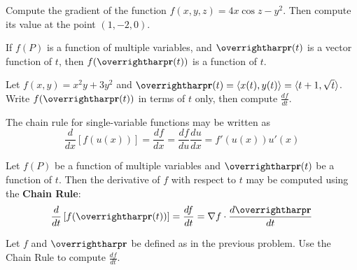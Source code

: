 \documentclass[letterpaper, twoside, 12pt]{book}
\begin{document}
          \begin{problem}
            Compute the gradient of the function $f(x,y,z)=4x\cos z-y^2$.
            Then compute its value at the point $(1,-2,0)$.
          \end{problem}

          \begin{solution}

          \end{solution}

\begin{remark}
  If $f(P)$ is a function of multiple variables, and
  $\vect{r}(t)$ is a vector function of $t$, then
  $f(\vect{r}(t))$ is a function of $t$.
\end{remark}

          \begin{problem}
            Let $f(x,y)=x^2y+3y^2$ and
            $\vect{r}(t)=\<x(t),y(t)\>=\<t+1,\sqrt{t}\>$.
            Write $f(\vect{r}(t))$ in terms of $t$ only, then
            compute $\frac{df}{dt}$.
          \end{problem}

          \begin{solution}

          \end{solution}

\begin{remark}
  The chain rule for single-variable functions may be written as
  \[
    \frac{d}{dx}\left[f(u(x))\right]
      =
    \frac{df}{dx}
      =
    \frac{df}{du}
    \frac{du}{dx}
      =
    f'(u(x))
    u'(x)
  \]
\end{remark}

\begin{theorem}
  Let $f(P)$ be a function of multiple variables and $\vect{r}(t)$
  be a function of $t$. Then the derivative of $f$ with respect to $t$
  may be computed using the \textbf{Chain Rule}:
  \[
    \frac{d}{dt}\left[f(\vect{r}(t))\right]
      =
    \frac{df}{dt}
      =
    \nabla f
    \cdot
    \frac{d\vect{r}}{dt}
  \]
\end{theorem}

          \begin{problem}
            Let $f$ and $\vect{r}$ be defined as in the previous problem.
            Use the Chain Rule to compute $\frac{df}{dt}$.
          \end{problem}

          \begin{solution}

          \end{solution}
\end{document}
